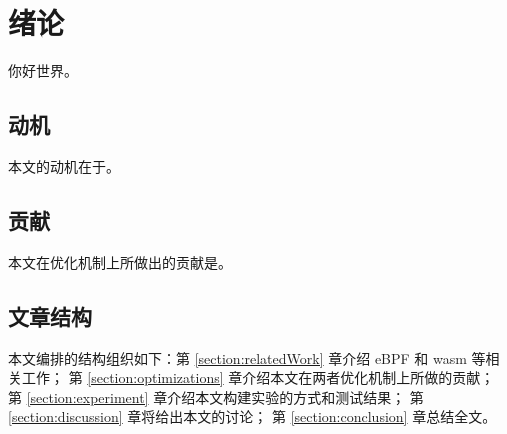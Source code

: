 \section{绪论}
    你好世界。
\subsection{动机}
    本文的动机在于。
\subsection{贡献}
    本文在优化机制上所做出的贡献是。
\subsection{文章结构}
    本文编排的结构组织如下：第 \ref{section:relatedWork} 章介绍 eBPF 和 wasm 等相关工作；
    第 \ref{section:optimizations} 章介绍本文在两者优化机制上所做的贡献；
    第 \ref{section:experiment} 章介绍本文构建实验的方式和测试结果；
    第 \ref{section:discussion} 章将给出本文的讨论；
    第 \ref{section:conclusion} 章总结全文。
